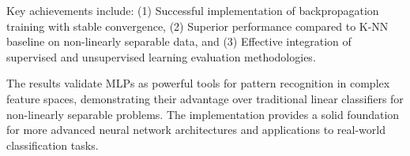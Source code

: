 \documentclass[11pt,a4paper]{article}
\begin{document}
Key achievements include: (1) Successful implementation of backpropagation training with stable convergence, (2) Superior performance compared to K-NN baseline on non-linearly separable data, and (3) Effective integration of supervised and unsupervised learning evaluation methodologies.

The results validate MLPs as powerful tools for pattern recognition in complex feature spaces, demonstrating their advantage over traditional linear classifiers for non-linearly separable problems. The implementation provides a solid foundation for more advanced neural network architectures and applications to real-world classification tasks.
\end{document}
